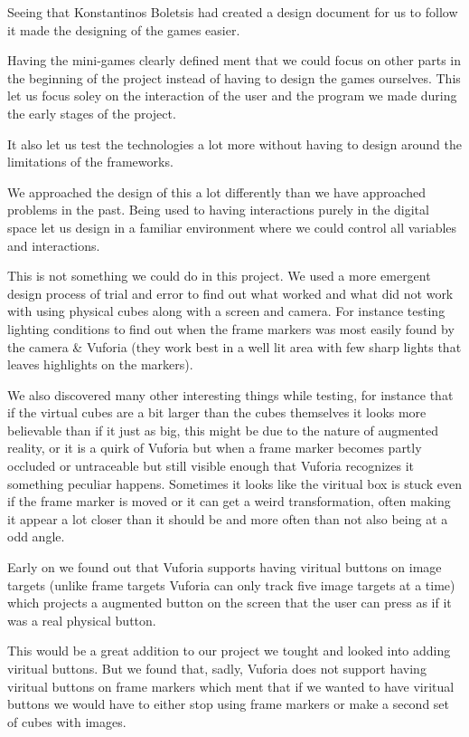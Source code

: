 Seeing that Konstantinos Boletsis had created a design document for us to follow it made the designing of the games easier.


Having the mini-games clearly defined ment that we could focus on other parts in the beginning of the project instead of having to design the games ourselves.
This let us focus soley on the interaction of the user and the program we made during the early stages of the project.

It also let us test the technologies a lot more without having to design around the limitations of the frameworks.


We approached the design of this a lot differently than we have approached problems in the past.
Being used to having interactions purely in the digital space let us design in a familiar environment where we could control all variables and interactions.

This is not something we could do in this project. 
We used a more emergent design process of trial and error to find out what worked and what did not work with using physical cubes along with a screen and camera.
For instance testing lighting conditions to find out when the frame markers was most easily found by the camera \& Vuforia (they work best in a well lit area with few sharp lights that leaves highlights on the markers).

We also discovered many other interesting things while testing, for instance that if the virtual cubes are a bit larger than the cubes themselves it looks more believable than if it just as big,
 this might be due to the nature of augmented reality, or it is a quirk of Vuforia but when a frame marker becomes partly occluded or untraceable but still visible enough that Vuforia recognizes it something peculiar happens.
Sometimes it looks like the viritual box is stuck even if the frame marker is moved or it can get a weird transformation, often making it appear a lot closer than it should be and more often than not also being at a odd angle.


Early on we found out that Vuforia supports having viritual buttons on image targets (unlike frame targets Vuforia can only track five image targets at a time) which projects a augmented button on the screen that the user can press as if it was a real physical button.

This would be a great addition to our project we tought and looked into adding viritual buttons.
But we found that, sadly, Vuforia does not support having viritual buttons on frame markers which ment that if we wanted to have viritual buttons we would have to either stop using frame markers or make a second set of cubes with images.

